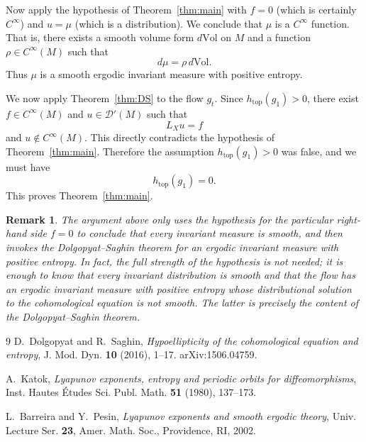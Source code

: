 \documentclass[11pt]{article}
\newtheorem{remark}[theorem]{Remark}
\begin{document}
Now apply the hypothesis of Theorem~\ref{thm:main} with \(f=0\) (which is certainly \(C^\infty\)) and \(u=\mu\) (which is a distribution). We conclude that \(\mu\) is a \(C^\infty\) function. That is, there exists a smooth volume form \(d\mathrm{Vol}\) on \(M\) and a function \(\rho\in C^\infty(M)\) such that
\[
d\mu=\rho\,d\mathrm{Vol}.
\]
Thus \(\mu\) is a smooth ergodic invariant measure with positive entropy.

We now apply Theorem~\ref{thm:DS} to the flow \(g_t\). Since \(h_{\mathrm{top}}(g_1)>0\), there exist \(f\in C^\infty(M)\) and \(u\in\mathcal D'(M)\) such that
\[
L_X u=f
\]
and \(u\notin C^\infty(M)\). This directly contradicts the hypothesis of Theorem~\ref{thm:main}. Therefore the assumption \(h_{\mathrm{top}}(g_1)>0\) was false, and we must have
\[
h_{\mathrm{top}}(g_1)=0.
\]
This proves Theorem~\ref{thm:main}.

\begin{remark}
The argument above only uses the hypothesis for the particular right-hand side \(f=0\) to conclude that every invariant measure is smooth, and then invokes the Dolgopyat--Saghin theorem for an ergodic invariant measure with positive entropy. In fact, the full strength of the hypothesis is not needed; it is enough to know that every invariant distribution is smooth and that the flow has an ergodic invariant measure with positive entropy whose distributional solution to the cohomological equation is not smooth. The latter is precisely the content of the Dolgopyat--Saghin theorem.
\end{remark}

\begin{thebibliography}{9}
D.~Dolgopyat and R.~Saghin,
\emph{Hypoellipticity of the cohomological equation and entropy},
J. Mod. Dyn. \textbf{10} (2016), 1--17.
arXiv:1506.04759.

A.~Katok,
\emph{Lyapunov exponents, entropy and periodic orbits for diffeomorphisms},
Inst. Hautes Études Sci. Publ. Math. \textbf{51} (1980), 137--173.

L.~Barreira and Y.~Pesin,
\emph{Lyapunov exponents and smooth ergodic theory},
Univ. Lecture Ser. \textbf{23}, Amer. Math. Soc., Providence, RI, 2002.
\end{thebibliography}
\end{document}
